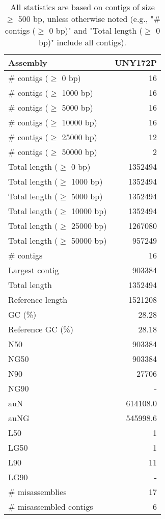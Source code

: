 \documentclass[12pt,a4paper]{article}
\begin{document}
\begin{table}[ht]
\begin{center}
\caption{All statistics are based on contigs of size $\geq$ 500 bp, unless otherwise noted (e.g., "\# contigs ($\geq$ 0 bp)" and "Total length ($\geq$ 0 bp)" include all contigs).}
\begin{tabular}{|l*{1}{|r}|}
\hline
Assembly & UNY172P \\ \hline
\# contigs ($\geq$ 0 bp) & 16 \\ \hline
\# contigs ($\geq$ 1000 bp) & 16 \\ \hline
\# contigs ($\geq$ 5000 bp) & 16 \\ \hline
\# contigs ($\geq$ 10000 bp) & 16 \\ \hline
\# contigs ($\geq$ 25000 bp) & 12 \\ \hline
\# contigs ($\geq$ 50000 bp) & 2 \\ \hline
Total length ($\geq$ 0 bp) & 1352494 \\ \hline
Total length ($\geq$ 1000 bp) & 1352494 \\ \hline
Total length ($\geq$ 5000 bp) & 1352494 \\ \hline
Total length ($\geq$ 10000 bp) & 1352494 \\ \hline
Total length ($\geq$ 25000 bp) & 1267080 \\ \hline
Total length ($\geq$ 50000 bp) & 957249 \\ \hline
\# contigs & 16 \\ \hline
Largest contig & 903384 \\ \hline
Total length & 1352494 \\ \hline
Reference length & 1521208 \\ \hline
GC (\%) & 28.28 \\ \hline
Reference GC (\%) & 28.18 \\ \hline
N50 & 903384 \\ \hline
NG50 & 903384 \\ \hline
N90 & 27706 \\ \hline
NG90 & - \\ \hline
auN & 614108.0 \\ \hline
auNG & 545998.6 \\ \hline
L50 & 1 \\ \hline
LG50 & 1 \\ \hline
L90 & 11 \\ \hline
LG90 & - \\ \hline
\# misassemblies & 17 \\ \hline
\# misassembled contigs & 6 \\ \hline

\end{tabular}
\end{center}
\end{table}
\end{document}
